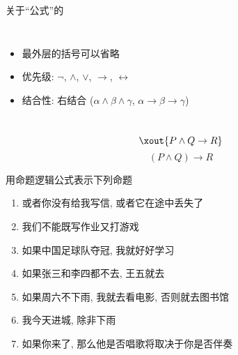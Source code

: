 \begin{frame}{}
  \begin{center}
    关于``公式''的

    \vspace{0.60cm}
    \begin{columns}
        \begin{itemize}
          \setlength{\itemsep}{6pt}
          \item 最外层的括号可以省略
          \item 优先级: $\lnot$, $\land$, $\lor$, $\to$, $\leftrightarrow$
          \item 结合性: 右结合 ($\alpha \land \beta \land \gamma$,
            $\alpha \to \beta \to \gamma$)
        \end{itemize}
    \end{columns}

    \pause
    \vspace{1.00cm}

    \[
      \xout{P \land Q \to R}
    \]
    \[
      (P \land Q) \to R
    \]
  \end{center}
\end{frame}

\begin{frame}{}
  \begin{exampleblock}{用命题逻辑公式表示下列命题}
    \begin{enumerate}[<+->][(1)]
      \setlength{\itemsep}{8pt}
      \item 或者你没有给我写信, 或者它在途中丢失了
      \item 我们不能既写作业又打游戏
      \item 如果中国足球队夺冠, 我就好好学习
      \item 如果张三和李四都不去, 王五就去
      \item 如果周六不下雨, 我就去看电影, 否则就去图书馆
      \item 我今天进城, 除非下雨
      \item 如果你来了, 那么他是否唱歌将取决于你是否伴奏
    \end{enumerate}
  \end{exampleblock}
\end{frame}

